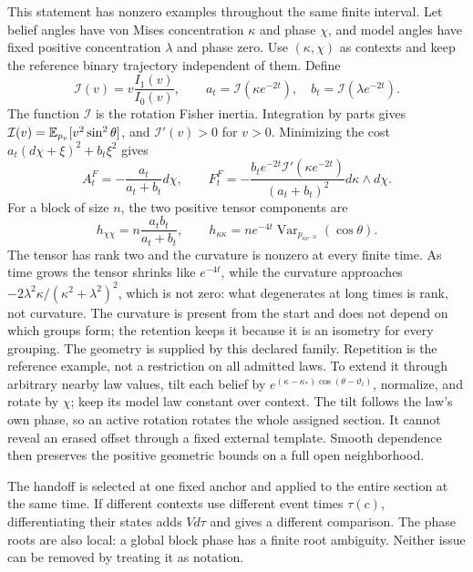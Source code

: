This statement has nonzero examples throughout the same finite interval. Let belief angles have von Mises concentration $\kappa$ and phase $\chi$, and model angles have fixed positive concentration $\lambda$ and phase zero. Use $(\kappa,\chi)$ as contexts and keep the reference binary trajectory independent of them. Define
\begin{equation}
\mathcal I(v)=v\frac{I_1(v)}{I_0(v)},\qquad
a_t=\mathcal I(\kappa e^{-2t}),\quad
b_t=\mathcal I(\lambda e^{-2t}).
\end{equation}
The function $\mathcal I$ is the rotation Fisher inertia. Integration by parts gives $\mathcal I(v)=\mathbb E_{p_v}[v^2\sin^2\theta]$, and $\mathcal I'(v)>0$ for $v>0$. Minimizing the cost $a_t(d\chi+\xi)^2+b_t\xi^2$ gives
\begin{equation}
A_t^F=-\frac{a_t}{a_t+b_t}d\chi,\qquad
F_t^F=-\frac{b_te^{-2t}\mathcal I'(\kappa e^{-2t})}
{(a_t+b_t)^2}d\kappa\wedge d\chi.
\label{co:curvature}
\end{equation}
For a block of size $n$, the two positive tensor components are
\begin{equation}
h_{\chi\chi}=n\frac{a_tb_t}{a_t+b_t},\qquad
h_{\kappa\kappa}
=n e^{-4t}\operatorname{Var}_{p_{\kappa e^{-2t}}}(\cos\theta).
\end{equation}
The tensor has rank two and the curvature is nonzero at every finite time. As time grows the tensor shrinks like $e^{-4t}$, while the curvature approaches $-2\lambda^2\kappa/(\kappa^2+\lambda^2)^2$, which is not zero: what degenerates at long times is rank, not curvature. The curvature is present from the start and does not depend on which groups form; the retention keeps it because it is an isometry for every grouping. The geometry is supplied by this declared family. Repetition is the reference example, not a restriction on all admitted laws. To extend it through arbitrary nearby law values, tilt each belief by
$e^{(\kappa-\kappa_*)\cos(\theta-\vartheta_i)}$, normalize, and rotate by $\chi$; keep its model law constant over context. The tilt follows the law's own phase, so an active rotation rotates the whole assigned section. It cannot reveal an erased offset through a fixed external template. Smooth dependence then preserves the positive geometric bounds on a full open neighborhood.

The handoff is selected at one fixed anchor and applied to the entire section at the same time. If different contexts use different event times $\tau(c)$, differentiating their states adds $Vd\tau$ and gives a different comparison. The phase roots are also local: a global block phase has a finite root ambiguity. Neither issue can be removed by treating it as notation.
